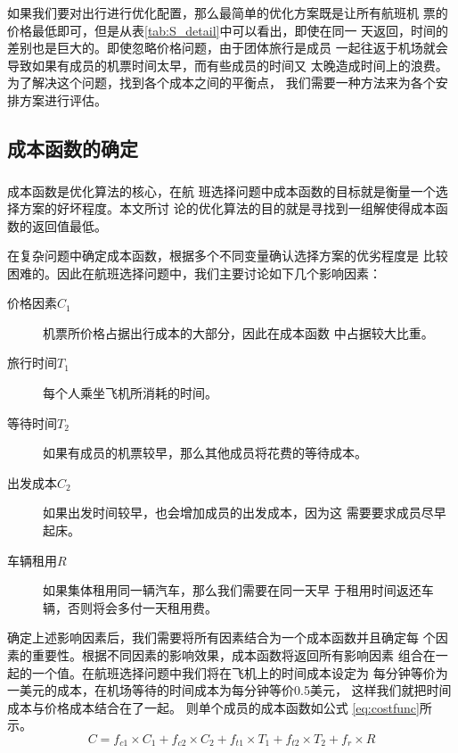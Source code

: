 \documentclass[fontset=fandol,a4paper,zihao=5]{ctexart}
\newcommand{\upcite}[1]{\textsuperscript{\textsuperscript{\cite{#1}}}}
\renewcommand{\eqref}[1]{公式 \ref{#1}}
\begin{document}
			如果我们要对出行进行优化配置，那么最简单的优化方案既是让所有航班机
            票的价格最低即可，但是从表\ref{tab:S_detail}中可以看出，即使在同一
            天返回，时间的差别也是巨大的。即使忽略价格问题，由于团体旅行是成员
            一起往返于机场就会导致如果有成员的机票时间太早，而有些成员的时间又
            太晚造成时间上的浪费。为了解决这个问题，找到各个成本之间的平衡点，
            我们需要一种方法来为各个安排方案进行评估。
		\subsection{成本函数的确定}
            \label{sec:fitness_func}
			成本函数是优化算法的核心\upcite{王凌2001智能优化算法及其应用}，在航
            班选择问题中成本函数的目标就是衡量一个选择方案的好坏程度。本文所讨
            论的优化算法的目的就是寻找到一组解使得成本函数的返回值最低。
			
			在复杂问题中确定成本函数，根据多个不同变量确认选择方案的优劣程度是
            比较困难的。因此在航班选择问题中，我们主要讨论如下几个影响因素：
			\begin{description}
				\item[价格因素$C_1$] 机票所价格占据出行成本的大部分，因此在成本函数
                    中占据较大比重。
				\item[旅行时间$T_1$] 每个人乘坐飞机所消耗的时间。
				\item[等待时间$T_2$] 如果有成员的机票较早，那么其他成员将花费的等待成本。
				\item[出发成本$C_2$] 如果出发时间较早，也会增加成员的出发成本，因为这
                    需要要求成员尽早起床。
				\item[车辆租用$R$] 如果集体租用同一辆汽车，那么我们需要在同一天早
                    于租用时间返还车辆，否则将会多付一天租用费。
			\end{description}
			确定上述影响因素后，我们需要将所有因素结合为一个成本函数并且确定每
            个因素的重要性。根据不同因素的影响效果，成本函数将返回所有影响因素
            组合在一起的一个值。在航班选择问题中我们将在飞机上的时间成本设定为
            每分钟等价为一美元的成本，在机场等待的时间成本为每分钟等价0.5美元，
            这样我们就把时间成本与价格成本结合在了一起。
            则单个成员的成本函数如\eqref{eq:costfunc}所示。
			\begin{equation}
                C = f_{c1} \times C_1 + f_{c2} \times C_2 + 
                f_{t1} \times T_1 + f_{t2} \times T_2 + f_r \times R
			    \label{eq:costfunc}
			\end{equation}
\end{document}

